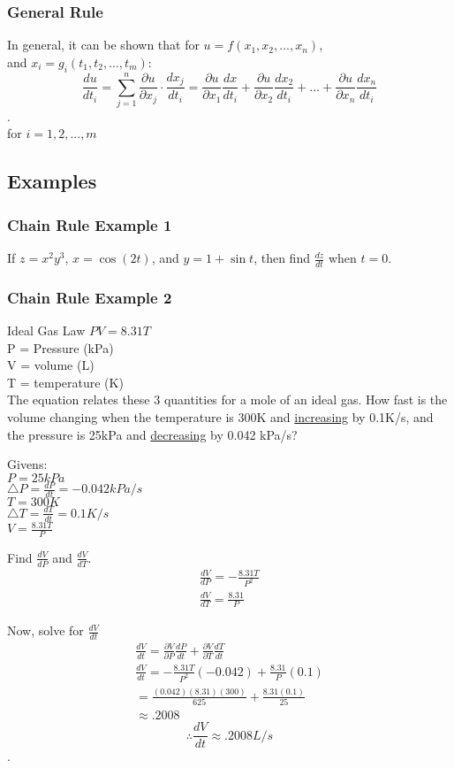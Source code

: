 \documentclass[12pt]{article}
\begin{document}
\subsubsection{General Rule}
In general, it can be shown that for \(u=f(x_1,x_2,...,x_n)\), \\%
and \(x_i = g_i(t_1,t_2,...,t_m)\):
\[
	\frac{du}{dt_i} = \sum_{j=1}^{n} \frac{\partial u}{\partial x_j} \cdot \frac{dx_j}{dt_i} = \frac{\partial u}{\partial x_1} \frac{dx}{dt_i} + \frac{\partial u}{\partial x_2}\frac{dx_2}{dt_i} + \hdots + \frac{\partial u}{\partial x_n} \frac{dx_n}{dt_i} 
\].\\
for \(i=1,2,...,m\)
\subsection{Examples}
\subsubsection{Chain Rule Example 1}
If \(z=x^2y^3\), \(x=\cos(2t)\), and \(y=1+\sin t\), then find \(\frac{dz}{dt}\) when \(t=0\).

\subsubsection{Chain Rule Example 2}
Ideal Gas Law \(PV=8.31T\)\\
P = Pressure (kPa)\\
V = volume (L)\\
T = temperature (K)\\
The equation relates these 3 quantities for a mole of an ideal gas. How fast is the volume changing when the temperature is 300K and \underline{increasing} by 0.1K/s, and the pressure is 25kPa and \underline{decreasing} by 0.042 kPa/s?

Givens:\\
\(P = 25kPa\)\\
\(\triangle P = \frac{dP}{dt} = -0.042 kPa/s\)\\
\(T = 300K\)\\
\(\triangle T = \frac{dT}{dt} = 0.1K/s\)\\
\(V = \frac{8.31T}{P}\)

Find \(\frac{dV}{dP}\) and \(\frac{dV}{dT} \).
\begin{align}
	\frac{dV}{dP} = -\frac{8.31T}{P^2}\\
	\frac{dV}{dT} = \frac{8.31}{P}
\end{align}

Now, solve for \(\frac{dV}{dt}\)
\begin{align}
	\frac{dV}{dt} = \frac{\partial V}{\partial P} \frac{dP}{dt} + \frac{\partial V}{\partial T} \frac{dT}{dt}\\
	\frac{dV}{dt} = -\frac{8.31T}{P^2}(-0.042) + \frac{8.31}{P}(0.1)\\
	=\frac{(0.042)(8.31)(300)}{625} + \frac{8.31(0.1)}{25}\\
	\approx .2008
\end{align}
\[
	\therefore \frac{dV}{dt} \approx .2008 L/s
\].
\end{document}
